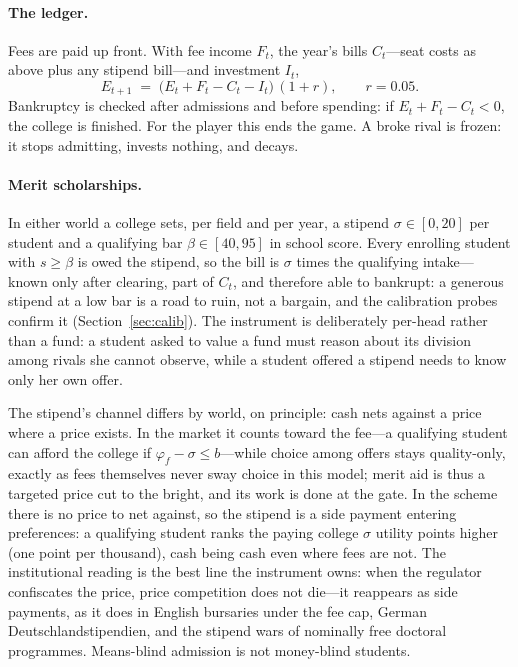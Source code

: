 \documentclass[11pt,a4paper]{article}
\begin{document}
\paragraph{The ledger.} Fees are paid up front. With fee income $F_t$, the year's bills $C_t$---seat costs as above plus any stipend bill---and investment $I_t$,
\[
E_{t+1} \;=\; \big(E_t + F_t - C_t - I_t\big)\,(1 + r), \qquad r = 0.05 .
\]
Bankruptcy is checked after admissions and before spending: if $E_t + F_t - C_t < 0$, the college is finished. For the player this ends the game. A broke rival is frozen: it stops admitting, invests nothing, and decays.

\paragraph{Merit scholarships.} In either world a college sets, per field and per year, a stipend $\sigma \in [0, 20]$ per student and a qualifying bar $\beta \in [40, 95]$ in school score. Every enrolling student with $s \ge \beta$ is owed the stipend, so the bill is $\sigma$ times the qualifying intake---known only after clearing, part of $C_t$, and therefore able to bankrupt: a generous stipend at a low bar is a road to ruin, not a bargain, and the calibration probes confirm it (Section~\ref{sec:calib}). The instrument is deliberately per-head rather than a fund: a student asked to value a fund must reason about its division among rivals she cannot observe, while a student offered a stipend needs to know only her own offer.

The stipend's channel differs by world, on principle: cash nets against a price where a price exists. In the market it counts toward the fee---a qualifying student can afford the college if $\varphi_f - \sigma \le b$---while choice among offers stays quality-only, exactly as fees themselves never sway choice in this model; merit aid is thus a targeted price cut to the bright, and its work is done at the gate. In the scheme there is no price to net against, so the stipend is a side payment entering preferences: a qualifying student ranks the paying college $\sigma$ utility points higher (one point per thousand), cash being cash even where fees are not. The institutional reading is the best line the instrument owns: when the regulator confiscates the price, price competition does not die---it reappears as side payments, as it does in English bursaries under the fee cap, German Deutschlandstipendien, and the stipend wars of nominally free doctoral programmes. Means-blind admission is not money-blind students.
\end{document}
